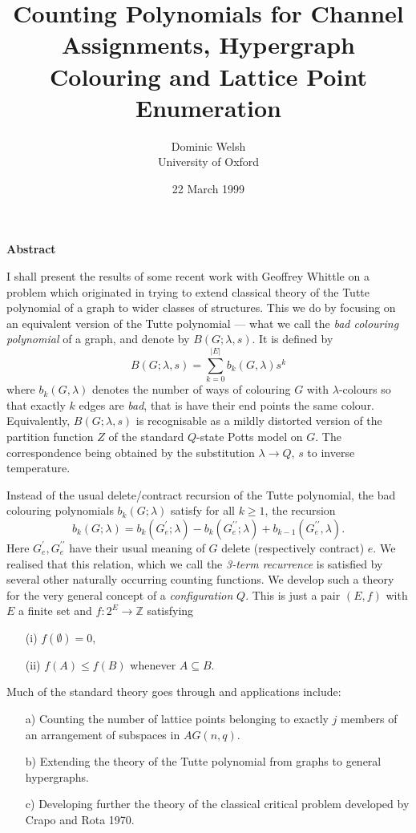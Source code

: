 \documentclass[12pt,leqno,bbold]{article}
\title{Counting Polynomials for Channel Assignments, 
Hypergraph Colouring and Lattice Point Enumeration}
\author{Dominic Welsh\\ University of Oxford}
\date{22 March 1999}
\begin{document}
\maketitle

\begin{center} {\bf Abstract} \end{center}

I shall present the results of some recent work with Geoffrey Whittle on a
problem which originated in trying to extend classical theory of the Tutte
polynomial of a graph to wider classes of structures.  This we do by focusing
on an equivalent version of the Tutte polynomial --- what we call the {\it bad
colouring polynomial} of a graph, and denote by $B(G;\lambda, s)$.  It is
defined by
        \[B(G;\lambda,s)=\sum^{|E|}_{k=0}b_k(G,\lambda)s^k\]
where $b_k(G,\lambda)$ denotes the number of ways of colouring $G$ with
$\lambda$-colours so that exactly $k$ edges are {\it bad}, that is have their
end points the same colour.  Equivalently, $B(G;\lambda,s)$ is recognisable as
a mildly distorted version of the partition function $Z$ of the standard
$Q$-state Potts
model on $G$.  The correspondence being obtained by the substitution
$\lambda\rightarrow Q$,
$s$ to inverse temperature.

Instead of the usual delete/contract recursion of the Tutte polynomial, the bad
colouring polynomials $b_k(G;\lambda)$ satisfy for all $k\geq 1$, the recursion
     \[b_k(G;\lambda)=b_k(G^\prime_e;\lambda)-b_k(G^{\prime\prime}_e;\lambda)+b_{k-1}(G^{\prime\prime}_e,\lambda).\]
Here $G^\prime_e,G^{\prime\prime}_e$ have their usual meaning of $G$ delete
(respectively contract) $e$.  We realised that this relation, which we
call the {\it 3-term recurrence} is satisfied by several other naturally occurring
counting functions.  We develop such a theory for the very general concept of a
{\it configuration} $Q$.  This is just a pair $(E,f)$ with $E$ a finite set and
$f:2^E\rightarrow{\mathbb Z}$ satisfying
\begin{enumerate}
\item[(i)] $f(\emptyset)=0$,
\item[(ii)] $f(A)\leq f(B)$ whenever $A\subseteq B$.
\end{enumerate}

Much of the standard theory goes through and applications include:
\begin{enumerate}
\item[a)] Counting the number of lattice points belonging to exactly $j$
members of an arrangement of subspaces in $AG(n,q)$.
\item[b)] Extending the theory of the Tutte polynomial from graphs to general hypergraphs.
\item[c)] Developing further the theory of the classical critical problem developed
by Crapo and Rota 1970.
\end{enumerate}
\end{document}
